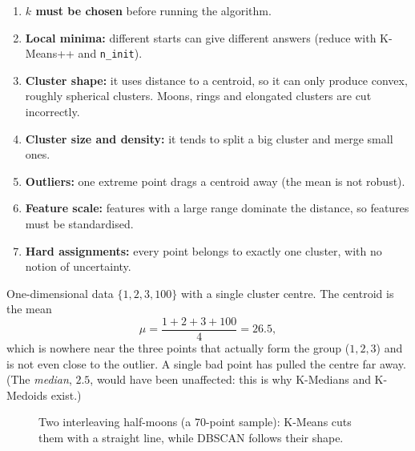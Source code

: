 \begin{enumerate}
  \item \textbf{$k$ must be chosen} before running the algorithm.
  \item \textbf{Local minima:} different starts can give different answers (reduce with K-Means++ and \texttt{n\_init}).
  \item \textbf{Cluster shape:} it uses distance to a centroid, so it can only produce convex, roughly spherical clusters. Moons, rings and elongated clusters are cut incorrectly.
  \item \textbf{Cluster size and density:} it tends to split a big cluster and merge small ones.
  \item \textbf{Outliers:} one extreme point drags a centroid away (the mean is not robust).
  \item \textbf{Feature scale:} features with a large range dominate the distance, so features must be standardised.
  \item \textbf{Hard assignments:} every point belongs to exactly one cluster, with no notion of uncertainty.
\end{enumerate}

\begin{example}
One-dimensional data $\{1,2,3,100\}$ with a single cluster centre. The centroid is the mean
\[
  \mu=\frac{1+2+3+100}{4}=26.5,
\]
which is nowhere near the three points that actually form the group ($1,2,3$) and is not even close to the outlier. A single bad point has pulled the centre far away. (The \emph{median}, $2.5$, would have been unaffected: this is why K-Medians and K-Medoids exist.)
\end{example}

\begin{figure}[!htbp]
\centering
{}
\caption{Two interleaving half-moons (a 70-point sample): K-Means cuts them with a straight line, while DBSCAN follows their shape.}\label{fig:moons}
\end{figure}

